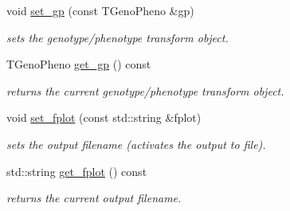 \begin{DoxyCompactItemize}
void \hyperlink{classlibcmaes_1_1Parameters_aeeab862124b864147e143bd86eb51cb5}{set\-\_\-gp} (const T\-Geno\-Pheno \&gp)
\begin{DoxyCompactList}\small\item\em sets the genotype/phenotype transform object. \end{DoxyCompactList}\item 
T\-Geno\-Pheno \hyperlink{classlibcmaes_1_1Parameters_a365039e6948ee2242c0ad34ed4ff02ab}{get\-\_\-gp} () const 
\begin{DoxyCompactList}\small\item\em returns the current genotype/phenotype transform object. \end{DoxyCompactList}\item 
void \hyperlink{classlibcmaes_1_1Parameters_ab96a2149ca63863d3f5618f54097df44}{set\-\_\-fplot} (const std\-::string \&fplot)
\begin{DoxyCompactList}\small\item\em sets the output filename (activates the output to file). \end{DoxyCompactList}\item 
std\-::string \hyperlink{classlibcmaes_1_1Parameters_a6787bd16e95db6125a5e131ad58574cc}{get\-\_\-fplot} () const 
\begin{DoxyCompactList}\small\item\em returns the current output filename. \end{DoxyCompactList}\end{DoxyCompactItemize}
